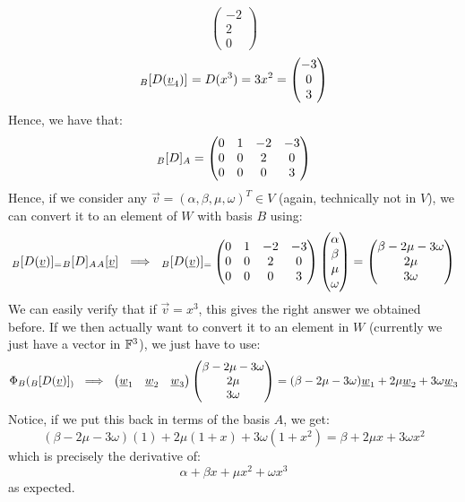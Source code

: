 \documentclass{exam}
\begin{document}
\begin{itemize}
\[\begin{pmatrix}
-2 \\
2 \\
0 
\end{pmatrix}
\]
\[
\cript{D(\vec{v}_4)}{B}{} = D(x^3) = 3x^2 = \begin{pmatrix}
-3 \\
0 \\
3 
\end{pmatrix}
\]
Hence, we have that:
\[
\cript{D}{B}{A} = \begin{pmatrix}
0 & 1 & -2 & -3 \\
0 & 0 & 2 & 0 \\
0 & 0 & 0 & 3
\end{pmatrix}
\]
Hence, if  we consider any $\vec{v} = (\alpha, \beta, \mu, \omega)^T \in V$ (again, technically not in $V$), we can convert it to an element of $W$ with basis $B$ using:
\[
\cript{D(\vec{v})}{B} = \cript{D}{B}{A} \cript{\vec{v}}{A}{} \ \implies \ \cript{D(\vec{v})}{B} = \begin{pmatrix}
0 & 1 & -2 & -3 \\
0 & 0 & 2 & 0 \\
0 & 0 & 0 & 3
\end{pmatrix}
\begin{pmatrix}
\alpha \\
\beta \\
\mu \\
\omega
\end{pmatrix}
= \begin{pmatrix}
\beta - 2\mu -3\omega \\
2\mu \\
3\omega 
\end{pmatrix}
\]
We can easily verify that if $\vec{v} = x^3$, this gives the right answer we obtained before. If we then actually want to convert it to an element in $W$ (currently we just have a vector in $\F^3$), we just have to use:
\[
\Phi_B(\cript{D(\vec{v})}{B} ) \ \implies \ \begin{pmatrix}
\vec{w}_1 & \vec{w}_2 & \vec{w}_3
\end{pmatrix}
\begin{pmatrix}
\beta - 2\mu -3\omega \\
2\mu \\
3\omega 
\end{pmatrix}
= (\beta - 2\mu - 3\omega)\vec{w}_1 + 2\mu\vec{w}_2 + 3\omega\vec{w}_3
\]
Notice, if we put this back in terms of the basis $A$, we get:
\[
(\beta - 2\mu - 3\omega)(1) + 2\mu (1 +x) + 3\omega(1+x^2) = \beta + 2\mu x + 3\omega x^2
\]
which is precisely the derivative of:
\[
\alpha + \beta x + \mu x^2 + \omega x^3
\]
as expected.
\end{itemize}
\end{document}
